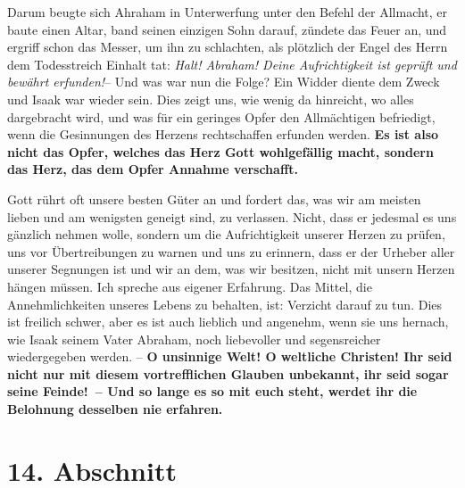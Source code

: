 Darum beugte sich Ahraham in Unterwerfung unter den Befehl der Allmacht,
 er
baute einen Altar, band seinen einzigen Sohn darauf, zündete das Feuer 
an, und
ergriff schon das Messer, um ihn zu schlachten, als plötzlich der Engel des
Herrn dem Todesstreich Einhalt tat: \textit{Halt! Abraham! Deine Aufrichtigkeit
ist
geprüft und bewährt erfunden!}-- Und was war nun die Folge? Ein Widder diente
dem Zweck und Isaak war wieder sein. Dies zeigt uns, wie wenig da
hinreicht, wo alles dargebracht wird, und was für ein geringes Opfer den
Allmächtigen befriedigt, wenn die Gesinnungen des Herzens rechtschaffen erfunden
werden. \label{ref:04_13_opfer} \textbf{Es ist also nicht das Opfer, welches
das Herz Gott wohlgefällig macht,
sondern das Herz, das dem Opfer Annahme verschafft.}

\medskip

Gott rührt oft unsere besten Güter an und fordert das, was wir am meisten
lieben und am wenigsten geneigt sind, zu verlassen. Nicht, dass er jedesmal es
uns gänzlich nehmen wolle, sondern um die Aufrichtigkeit unserer Herzen zu
prüfen, uns vor Übertreibungen zu warnen und uns zu erinnern, dass er der
Urheber aller unserer Segnungen ist und wir an dem, was wir besitzen, nicht mit
unsern Herzen hängen müssen. Ich spreche aus eigener Erfahrung. Das Mittel, die
Annehmlichkeiten unseres Lebens zu behalten, ist: Verzicht darauf zu tun. Dies
ist freilich schwer, aber es ist auch lieblich und angenehm, wenn sie uns
hernach, wie Isaak seinem Vater Abraham, noch liebevoller und
segensreicher wiedergegeben werden. -- \label{ref:04_13_weltliche_christen}
\textbf{O unsinnige Welt! O weltliche Christen!
Ihr seid nicht nur mit diesem vortrefflichen Glauben unbekannt, ihr seid sogar
seine Feinde!~-- Und so lange es so mit euch steht, werdet ihr die Belohnung
desselben nie erfahren.}

\section{14. Abschnitt} \label{kap4_ab14}

